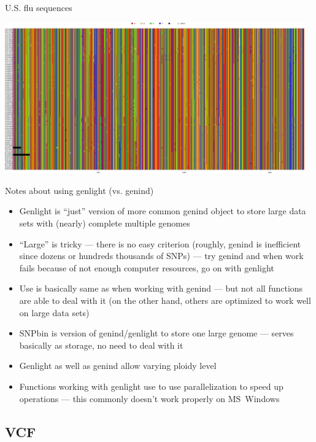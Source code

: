 \documentclass[compress, ucs, xelatex, 11pt, xcolor=svgnames, aspectratio=169,
	hyperref={
		bookmarks=true,
		unicode=true,
		colorlinks=true,
		pdftitle={Molecular data in R},
		plainpages=false,
		pdfauthor={Vojtech Zeisek},
		pdfsubject={Course about phylogeny and evolution in R},
		pdfcreator={XeLaTeX},
		pdfkeywords={R, evolution, phylogeny, molecular data},
		linkcolor=Crimson, %
		anchorcolor=Magenta, %
		citecolor=Magenta, %
		filecolor=Magenta, %
		menucolor=Magenta, %
		urlcolor=DodgerBlue, %
		pdftex},
	url={hyphens, lowtilde} %
	]{beamer}
\begin{document}
\begin{frame}{U.S. flu sequences}
	\begin{center}
		\includegraphics[height=6.5cm]{sequences_usflu.png}
	\end{center}
\end{frame}

\begin{frame}{Notes about using genlight (vs. genind)}
	\begin{itemize}
		\item Genlight is \enquote{just} version of more common genind object to store large data sets with (nearly) complete multiple genomes
		\item \enquote{Large} is tricky --- there is no easy criterion (roughly, genind is inefficient since dozens or hundreds thousands of SNPs) --- try genind and when work fails because of not enough computer resources, go on with genlight
		\item Use is basically same as when working with genind --- but not all functions are able to deal with it (on the other hand, others are optimized to work well on large data sets)
		\item SNPbin is version of genind/genlight to store one large genome --- serves basically as storage, no need to deal with it
		\item Genlight as well as genind allow varying ploidy level
		\item Functions working with genlight use to use parallelization to speed up operations --- this commonly doesn't work properly on MS~Windows
	\end{itemize}
\end{frame}

\subsection{VCF}
\end{document}
